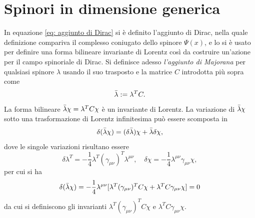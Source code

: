 \section{Spinori in dimensione generica}
In equazione \eqref{eq: aggiunto di Dirac} si è definito l'aggiunto di Dirac, nella quale definizione compariva il complesso coniugato dello spinore $\Psi(x)$, e lo si è usato per definire una forma bilineare invariante di Lorentz così da costruire un'azione per il campo spinoriale di Dirac. Si definisce adesso \emph{l'aggiunto di Majorana} per qualsiasi spinore $\lambda$ usando il suo trasposto e la matrice $C$ introdotta più sopra come 
\begin{equation}
\label{eq: aggiunto di Majorana}
    \bar{\lambda} := \lambda^TC.
\end{equation}
La forma bilineare $\bar{\lambda}\chi = \lambda^TC\chi$ è un invariante di Lorentz. La variazione di $\bar{\lambda}\chi$ sotto una trasformazione di Lorentz infinitesima può essere scomposta in
\begin{equation}
\delta(\bar{\lambda}\chi) = (\delta\bar{\lambda})\chi + \bar{\lambda}\delta\chi,
\end{equation}
dove le singole variazioni risultano essere
\begin{equation}
    \delta\lambda^T = -\frac{1}{4}\lambda^T(\gamma_{\mu\nu})^T\lambda^{\mu\nu},\quad \delta\chi = -\frac{1}{4}\lambda^{\mu\nu}\gamma_{\mu\nu}\chi,
\end{equation}
per cui si ha 
\begin{equation}
    \delta(\bar{\lambda}\chi) = -\frac{1}{4}\lambda^{\mu\nu}[\lambda^T(\gamma_{\mu\nu})^TC\chi + \lambda^TC\gamma_{\mu\nu}\chi] = 0
\end{equation}
da cui si definiscono gli invarianti $\lambda^T(\gamma_{\mu\nu})^TC\chi$ e $\lambda^TC\gamma_{\mu\nu}\chi$.

